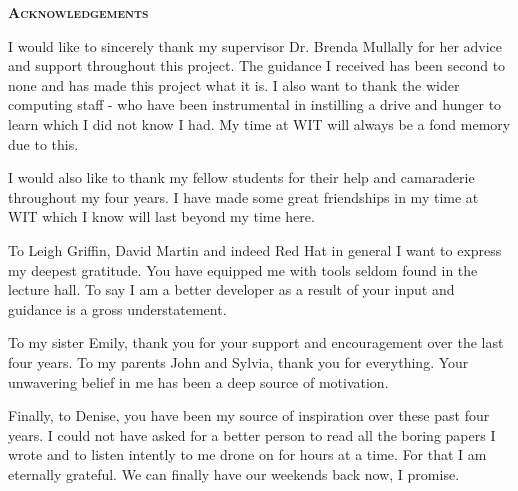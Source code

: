 \begin{center}
{\scshape\LARGE \textbf{Acknowledgements}\par}
\end{center}
\thispagestyle{empty}
\vspace{1cm}
I would like to sincerely thank my supervisor Dr. Brenda Mullally for her advice and support throughout this project. The guidance I received has been second to none and has made this project what it is. I also want to thank the wider computing staff - who have been instrumental in instilling a drive and hunger to learn which I did not know I had. My time at WIT will always be a fond memory due to this. 

I would also like to thank my fellow students for their help and camaraderie throughout my four years. I have made some great friendships in my time at WIT which I know will last beyond my time here.

To Leigh Griffin, David Martin and indeed Red Hat in general I want to express my deepest gratitude. You have equipped me with tools seldom found in the lecture hall. To say I am a better developer as a result of your input and guidance is a gross understatement.

To my sister Emily, thank you for your support and encouragement over the last four years. To my parents John and Sylvia, thank you for everything. Your unwavering belief in me has been a deep source of motivation.

Finally, to Denise, you have been my source of inspiration over these past four years. I could not have asked for a better person to read all the boring papers I wrote and to listen intently to me drone on for hours at a time. For that I am eternally grateful. We can finally have our weekends back now, I promise.

\clearpage
